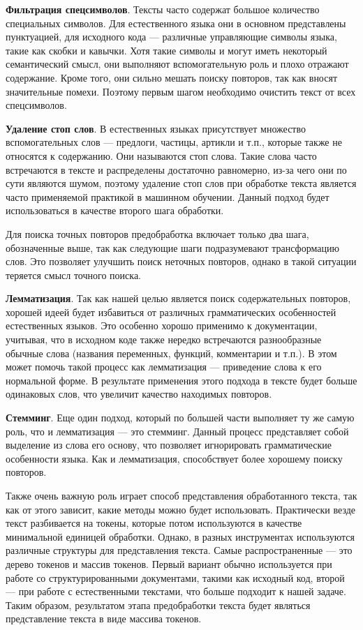 \documentclass[14pt]{matmex-diploma-custom}
\begin{document}
\textbf{Фильтрация спецсимволов}. Тексты часто содержат большое количество специальных символов. Для естественного языка они в основном представлены пунктуацией, для исходного кода --- различные управляющие символы языка, такие как скобки и кавычки. Хотя такие символы и могут иметь некоторый семантический смысл, они выполняют вспомогательную роль и плохо отражают содержание. Кроме того, они сильно мешать поиску повторов, так как вносят значительные помехи. Поэтому первым шагом необходимо очистить текст от всех спецсимволов.

\textbf{Удаление стоп слов}. В естественных языках присутствует множество вспомогательных слов --- предлоги, частицы, артикли и т.п., которые также не относятся к содержанию. Они называются стоп слова. Такие слова часто встречаются в тексте и распределены достаточно равномерно, из-за чего они по сути являются шумом, поэтому удаление стоп слов при обработке текста является часто применяемой практикой в машинном обучении. Данный подход будет использоваться в качестве второго шага обработки.

Для поиска точных повторов предобработка включает только два шага, обозначенные выше, так как следующие шаги подразумевают трансформацию слов. Это позволяет улучшить поиск неточных повторов, однако в такой ситуации теряется смысл точного поиска.

\textbf{Лемматизация}. Так как нашей целью является поиск содержательных повторов, хорошей идеей будет избавиться от различных грамматических особенностей естественных языков. Это особенно хорошо применимо к документации, учитывая, что в исходном коде также нередко встречаются разнообразные обычные слова (названия переменных, функций, комментарии и т.п.). В этом может помочь такой процесс как лемматизация --- приведение слова к его нормальной форме. В результате применения этого подхода в тексте будет больше одинаковых слов, что увеличит качество находимых повторов.

\textbf{Стемминг}. Еще один подход, который по большей части выполняет ту же самую роль, что и лемматизация --- это стемминг. Данный процесс представляет собой выделение из слова его основу, что позволяет игнорировать грамматические особенности языка. Как и лемматизация, способствует более хорошему поиску повторов.

Также очень важную роль играет способ представления обработанного текста, так как от этого зависит, какие методы можно будет использовать. Практически везде текст разбивается на токены, которые потом используются в качестве минимальной единицей обработки. Однако, в разных инструментах используются различные структуры для представления текста. Самые распространенные --- это дерево токенов и массив токенов. Первый вариант обычно используется при работе со структурированными документами, такими как исходный код, второй --- при работе с естественными текстами, что больше подходит к нашей задаче. Таким образом, результатом этапа предобработки текста будет являться представление текста в виде массива токенов.
\end{document}
